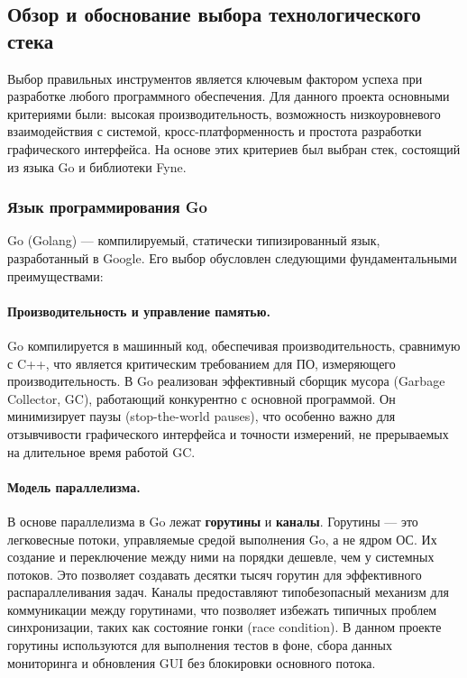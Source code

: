 \subsection{Обзор и обоснование выбора технологического стека}

Выбор правильных инструментов является ключевым фактором успеха при разработке любого программного обеспечения. Для данного проекта основными критериями были: высокая производительность, возможность низкоуровневого взаимодействия с системой, кросс-платформенность и простота разработки графического интерфейса. На основе этих критериев был выбран стек, состоящий из языка Go и библиотеки Fyne.

\subsubsection{Язык программирования Go}

Go (Golang) — компилируемый, статически типизированный язык, разработанный в Google. Его выбор обусловлен следующими фундаментальными преимуществами:

\paragraph{Производительность и управление памятью.} Go компилируется в машинный код, обеспечивая производительность, сравнимую с C++, что является критическим требованием для ПО, измеряющего производительность. В Go реализован эффективный сборщик мусора (Garbage Collector, GC), работающий конкурентно с основной программой. Он минимизирует паузы (stop-the-world pauses), что особенно важно для отзывчивости графического интерфейса и точности измерений, не прерываемых на длительное время работой GC.

\paragraph{Модель параллелизма.} В основе параллелизма в Go лежат \textbf{горутины} и \textbf{каналы}. Горутины — это легковесные потоки, управляемые средой выполнения Go, а не ядром ОС. Их создание и переключение между ними на порядки дешевле, чем у системных потоков. Это позволяет создавать десятки тысяч горутин для эффективного распараллеливания задач. Каналы предоставляют типобезопасный механизм для коммуникации между горутинами, что позволяет избежать типичных проблем синхронизации, таких как состояние гонки (race condition). В данном проекте горутины используются для выполнения тестов в фоне, сбора данных мониторинга и обновления GUI без блокировки основного потока.

